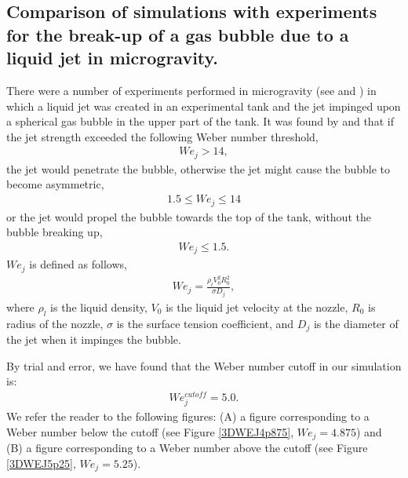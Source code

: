 \documentclass[]{article}
\begin{document}
\subsection{Comparison of simulations with experiments for the
  break-up of a gas bubble due to a liquid jet in microgravity.
  \label{TPCEsec} }


There were a number of experiments performed in microgravity
(see \cite{bentz1992jet} and \cite{bentz1993low})
in which a liquid jet was created in an experimental tank and the
jet impinged upon a spherical gas bubble in the upper part of the
tank.  It was found by 
\cite{bentz1992jet} and \cite{bentz1993low} that if the jet strength
exceeded the following Weber number threshold, 
\begin{eqnarray*}
We_{j}>14,
\end{eqnarray*}
the jet would penetrate the 
bubble, otherwise the jet might cause the bubble to become 
asymmetric, 
\begin{eqnarray*}
1.5\le We_{j}\le 14
\end{eqnarray*}
or the jet would propel the bubble towards the
top of the tank, without the bubble breaking up,
\begin{eqnarray*}
We_{j}\le 1.5.
\end{eqnarray*}
$We_{j}$ is defined as follows,
\begin{eqnarray*}
We_{j}=\frac{\rho_{l} V_{0}^{2} R_{0}^{2}}{\sigma D_{j}},
\end{eqnarray*}
where $\rho_{l}$ is the liquid density, $V_{0}$ is the liquid
jet velocity at the nozzle, $R_{0}$ is radius of the nozzle,
$\sigma$ is the surface tension coefficient, and $D_{j}$ is the 
diameter of 
the jet when it impinges the bubble. 

By trial and error, we have found that the Weber number cutoff in
our simulation is:
\begin{eqnarray*}
We_{j}^{cutoff}=5.0.
\end{eqnarray*}
We refer the reader to the following figures: 
(A) a figure corresponding to a Weber number
below the cutoff (see Figure \ref{3DWEJ4p875}, $We_{j}=4.875$) and
(B) a figure corresponding to a Weber number
above the cutoff (see Figure \ref{3DWEJ5p25}, $We_{j}=5.25$).
\end{document}
